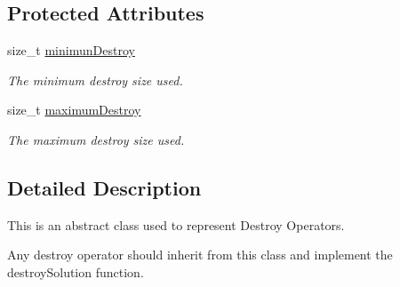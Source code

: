 \subsection*{Protected Attributes}
\begin{DoxyCompactItemize}
\item 
\hypertarget{classADestroyOperator_a966017d5974080bade3385ccf805bf52}{size\-\_\-t \hyperlink{classADestroyOperator_a966017d5974080bade3385ccf805bf52}{minimun\-Destroy}}\label{classADestroyOperator_a966017d5974080bade3385ccf805bf52}

\begin{DoxyCompactList}\small\item\em The minimum destroy size used. \end{DoxyCompactList}\item 
\hypertarget{classADestroyOperator_a5b5ab82e3407c05cf1ff1d90c0e31905}{size\-\_\-t \hyperlink{classADestroyOperator_a5b5ab82e3407c05cf1ff1d90c0e31905}{maximum\-Destroy}}\label{classADestroyOperator_a5b5ab82e3407c05cf1ff1d90c0e31905}

\begin{DoxyCompactList}\small\item\em The maximum destroy size used. \end{DoxyCompactList}\end{DoxyCompactItemize}


\subsection{Detailed Description}
This is an abstract class used to represent Destroy Operators. 

Any destroy operator should inherit from this class and implement the destroy\-Solution function. 

